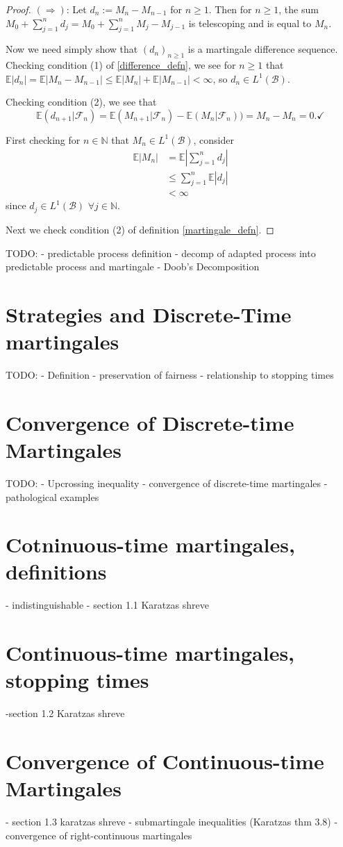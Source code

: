 \begin{proof}
    \((\Rightarrow)\): Let \(d_{n} := M_{n} - M_{n-1}\) for \(n \geq 1\). Then for \(n \geq 1\), the sum \(M_{0} + \sum\limits_{j=1}^{n} d_{j} = M_{0} + \sum\limits_{j=1}^{n} M_{j} - M_{j-1}\) is telescoping and is equal to \(M_{n}\).
    
    Now we need simply show that \((d_{n})_{n \geq 1}\) is a martingale difference sequence. Checking condition (1) of \ref{difference_defn}, we see for \(n \geq 1\) that \(\mathbb{E}|d_{n}| = \mathbb{E}|M_{n} - M_{n-1}| \leq \mathbb{E}|M_{n}| + \mathbb{E}|M_{n-1}|< \infty\), so \(d_{n} \in L^{1}(\mathcal{B})\).

    Checking condition (2), we see that
    \[\mathbb{E}(d_{n+1}|\mathcal{F}_{n}) = \mathbb{E}(M_{n+1}|\mathcal{F}_{n})- \mathbb{E}(M_{n}|\mathcal{F}_{n})) = M_{n} - M_{n} = 0. \checkmark\]

    First checking for \(n \in \mathbb{N}\) that \(M_{n} \in L^{1}(\mathcal{B})\), consider
    \begin{align*}
        \mathbb{E}|M_{n}| &= \mathbb{E}\left| \sum\limits_{j=1}^{n} d_{j}  \right| \\
        & \leq  \sum\limits_{j=1}^{n} \mathbb{E}| d_{j} | \\
        & < \infty
    \end{align*}
    since \(d_{j} \in L^{1}(\mathcal{B})\) \(\forall j \in \mathbb{N}\).

    Next we check condition (2) of definition \ref{martingale_defn}. 
\end{proof}

TODO: 
- predictable process definition
- decomp of adapted process into predictable process and martingale
- Doob's Decomposition

\section{Strategies and Discrete-Time martingales}
TODO:
- Definition
- preservation of fairness
- relationship to stopping times

\section{Convergence of Discrete-time Martingales}

TODO:
- Upcrossing inequality
- convergence of discrete-time martingales
- pathological examples

\section{Cotninuous-time martingales, definitions}
- indistinguishable
- section 1.1 Karatzas shreve

\section{Continuous-time martingales, stopping times}
-section 1.2 Karatzas shreve

\section{Convergence of Continuous-time Martingales}
- section 1.3 karatzas shreve
- submartingale inequalities (Karatzas thm 3.8)
- convergence of right-continuous martingales